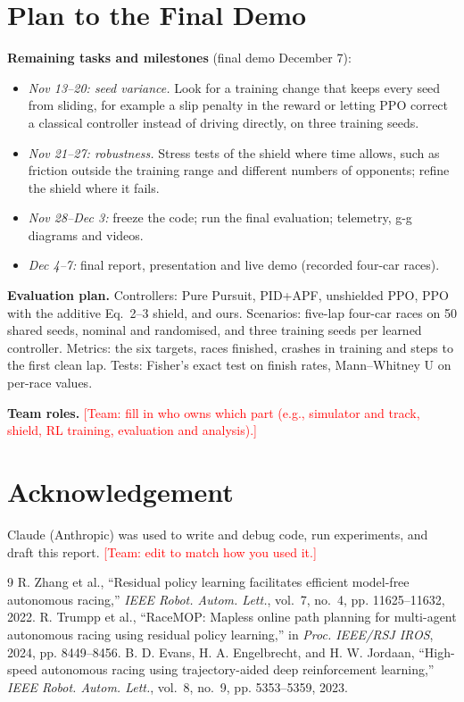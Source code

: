 \documentclass[conference]{IEEEtran}
\newcommand{\todo}[1]{\textcolor{red}{[#1]}}
\begin{document}
\section{Plan to the Final Demo}
\textbf{Remaining tasks and milestones} (final demo December 7):
\begin{itemize}
\item \emph{Nov 13--20: seed variance.} Look for a training change that keeps every seed from sliding, for
example a slip penalty in the reward or letting PPO correct a classical controller instead of driving directly,
on three training seeds.
\item \emph{Nov 21--27: robustness.} Stress tests of the shield where time allows, such as friction outside the
training range and different numbers of opponents; refine the shield where it fails.
\item \emph{Nov 28--Dec 3:} freeze the code; run the final evaluation; telemetry, g-g diagrams and videos.
\item \emph{Dec 4--7:} final report, presentation and live demo (recorded four-car races).
\end{itemize}
\textbf{Evaluation plan.} Controllers: Pure Pursuit, PID+APF, unshielded PPO, PPO with the additive Eq.~2--3
shield, and ours. Scenarios: five-lap four-car races on 50 shared seeds, nominal and randomised, and three
training seeds per learned controller. Metrics: the six targets, races finished, crashes
in training and steps to the first clean lap. Tests: Fisher's exact test on finish rates, Mann--Whitney U on
per-race values.

\textbf{Team roles.} \todo{Team: fill in who owns which part (e.g., simulator and track, shield, RL training,
evaluation and analysis).}

\section*{Acknowledgement}
Claude (Anthropic) was used to write and debug code, run experiments, and draft this report. \todo{Team: edit to
match how you used it.}

\begin{thebibliography}{9}
 R. Zhang et al., ``Residual policy learning facilitates efficient model-free autonomous
racing,'' \emph{IEEE Robot. Autom. Lett.}, vol.~7, no.~4, pp. 11625--11632, 2022.
 R. Trumpp et al., ``RaceMOP: Mapless online path planning for multi-agent autonomous racing
using residual policy learning,'' in \emph{Proc. IEEE/RSJ IROS}, 2024, pp. 8449--8456.
 B. D. Evans, H. A. Engelbrecht, and H. W. Jordaan, ``High-speed autonomous racing using
trajectory-aided deep reinforcement learning,'' \emph{IEEE Robot. Autom. Lett.}, vol.~8, no.~9, pp. 5353--5359,
2023.
\end{thebibliography}
\end{document}
